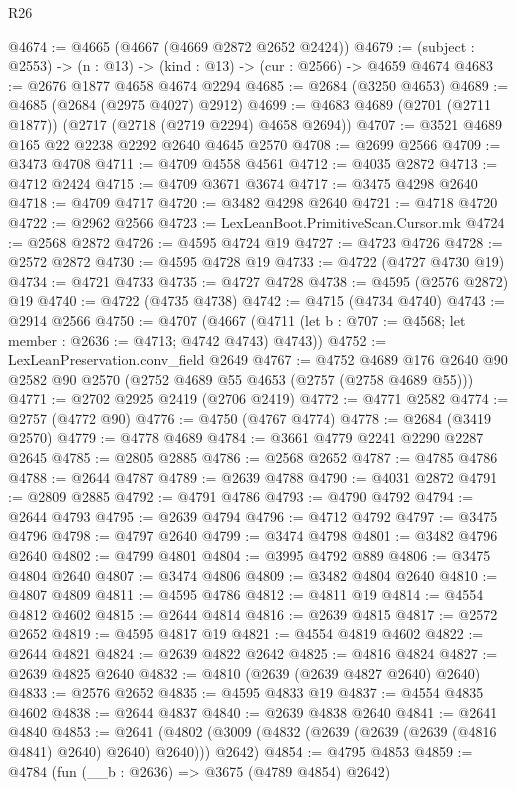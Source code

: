 \begin{lexlean}{R26}
\begin{coremodule}
@4674 := @4665 (@4667 (@4669 @2872 @2652 @2424))
@4679 := (subject : @2553) -> (n : @13) -> (kind : @13) -> (cur : @2566) -> @4659 @4674
@4683 := @2676 @1877 @4658 @4674 @2294
@4685 := @2684 (@3250 @4653)
@4689 := @4685 (@2684 (@2975 @4027) @2912)
@4699 := @4683 @4689 (@2701 (@2711 @1877)) (@2717 (@2718 (@2719 @2294) @4658 @2694))
@4707 := @3521 @4689 @165 @22 @2238 @2292 @2640 @4645 @2570
@4708 := @2699 @2566
@4709 := @3473 @4708
@4711 := @4709 @4558 @4561
@4712 := @4035 @2872
@4713 := @4712 @2424
@4715 := @4709 @3671 @3674
@4717 := @3475 @4298 @2640
@4718 := @4709 @4717
@4720 := @3482 @4298 @2640
@4721 := @4718 @4720
@4722 := @2962 @2566
@4723 := LexLeanBoot.PrimitiveScan.Cursor.mk
@4724 := @2568 @2872
@4726 := @4595 @4724 @19
@4727 := @4723 @4726
@4728 := @2572 @2872
@4730 := @4595 @4728 @19
@4733 := @4722 (@4727 @4730 @19)
@4734 := @4721 @4733
@4735 := @4727 @4728
@4738 := @4595 (@2576 @2872) @19
@4740 := @4722 (@4735 @4738)
@4742 := @4715 (@4734 @4740)
@4743 := @2914 @2566
@4750 := @4707
    (@4667 (@4711 (let b : @707 := @4568; let member : @2636 := @4713; @4742 @4743) @4743))
@4752 := LexLeanPreservation.conv_field @2649
@4767 := @4752
    @4689
    @176
    @2640
    @90
    @2582
    @90
    @2570
    (@2752 @4689 @55 @4653 (@2757 (@2758 @4689 @55)))
@4771 := @2702 @2925 @2419 (@2706 @2419)
@4772 := @4771 @2582
@4774 := @2757 (@4772 @90)
@4776 := @4750 (@4767 @4774)
@4778 := @2684 (@3419 @2570)
@4779 := @4778 @4689
@4784 := @3661 @4779 @2241 @2290 @2287 @2645
@4785 := @2805 @2885
@4786 := @2568 @2652
@4787 := @4785 @4786
@4788 := @2644 @4787
@4789 := @2639 @4788
@4790 := @4031 @2872
@4791 := @2809 @2885
@4792 := @4791 @4786
@4793 := @4790 @4792
@4794 := @2644 @4793
@4795 := @2639 @4794
@4796 := @4712 @4792
@4797 := @3475 @4796
@4798 := @4797 @2640
@4799 := @3474 @4798
@4801 := @3482 @4796 @2640
@4802 := @4799 @4801
@4804 := @3995 @4792 @889
@4806 := @3475 @4804 @2640
@4807 := @3474 @4806
@4809 := @3482 @4804 @2640
@4810 := @4807 @4809
@4811 := @4595 @4786
@4812 := @4811 @19
@4814 := @4554 @4812 @4602
@4815 := @2644 @4814
@4816 := @2639 @4815
@4817 := @2572 @2652
@4819 := @4595 @4817 @19
@4821 := @4554 @4819 @4602
@4822 := @2644 @4821
@4824 := @2639 @4822 @2642
@4825 := @4816 @4824
@4827 := @2639 @4825 @2640
@4832 := @4810 (@2639 (@2639 @4827 @2640) @2640)
@4833 := @2576 @2652
@4835 := @4595 @4833 @19
@4837 := @4554 @4835 @4602
@4838 := @2644 @4837
@4840 := @2639 @4838 @2640
@4841 := @2641 @4840
@4853 := @2641 (@4802 (@3009 (@4832 (@2639 (@2639 (@2639 (@4816 @4841) @2640) @2640) @2640))) @2642)
@4854 := @4795 @4853
@4859 := @4784 (fun (__b : @2636) => @3675 (@4789 @4854) @2642)

\end{coremodule}
\end{lexlean}
